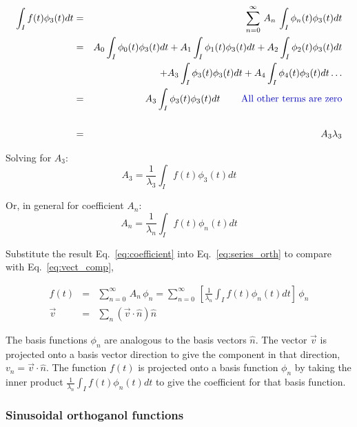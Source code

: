 \documentclass[12pt]{article}
\begin{document}
\begin{flushleft}
\begin{eqnarray*}
\int_{I} f(t) \phi_{3}(t) dt  & = &  \sum_{n=0}^{\infty} \, A_{n}\, \int_{I} \phi_{n}(t) \phi_{3}(t) dt \\
 & =  & A_{0} \int_{I} \phi_{0}(t) \phi_{3}(t) dt + A_{1} \int_{I} \phi_{1}(t) \phi_{3}(t) dt+ A_{2} \int_{I} \phi_{2}(t) \phi_{3}(t) dt \\
 & &   \hspace{.2in} + A_{3} \int_{I} \phi_{3}(t) \phi_{3}(t) dt + A_{4} \int_{I} \phi_{4}(t) \phi_{3}(t) dt \ldots \\
& =  & A_{3} \int_{I} \phi_{3}(t) \phi_{3}(t) dt \hspace{.3in} \text{\color{myblue} All other terms are zero} \\
\vspace{.05in}\\
& =  & A_{3} \lambda_{3}
\end{eqnarray*}

Solving for $A_{3}$:
\[
 A_{3} =\frac{1}{\lambda_{3}} \int_{I} f(t) \phi_{3}(t) dt 
\]

Or, in general for coefficient $A_{n}$:
\begin{equation}
 A_{n} =\frac{1}{\lambda_{n}} \int_{I} f(t) \phi_{n}(t) dt 
 \label{eq:coefficient}
\end{equation}

Substitute the result Eq.~\ref{eq:coefficient} into Eq.~\ref{eq:series_orth} to compare with Eq.~\ref{eq:vect_comp},

\begin{eqnarray*}
f(t) & = & \sum_{n=0}^{\infty} \, A_{n}\, \phi_{n} = \sum_{n=0}^{\infty} \, \left[  \frac{1}{\lambda_{n}} \int_{I} f(t) \phi_{n}(t) dt  \right] \, \phi_{n} \\
\vec{v} & = & \sum_{n} (\vec{v}\cdot \hat{n})\hat{n}
\end{eqnarray*}

The basis functions $\phi_{n}$ are analogous to the basis vectors $\hat{n}$.  The vector $\vec{v}$ is projected onto a basis vector direction to give the component in that direction, $v_{n}=\vec{v}\cdot \hat{n}$.  The function $f(t)$ is projected onto a basis function $\phi_{n}$ by taking the inner product $\frac{1}{\lambda_{n}} \int_{I} f(t) \phi_{n}(t) dt$ to give the coefficient for that basis function.


\subsubsection*{\bf \color{mygreen} Sinusoidal orthoganol functions}


\end{flushleft}
\end{document}
